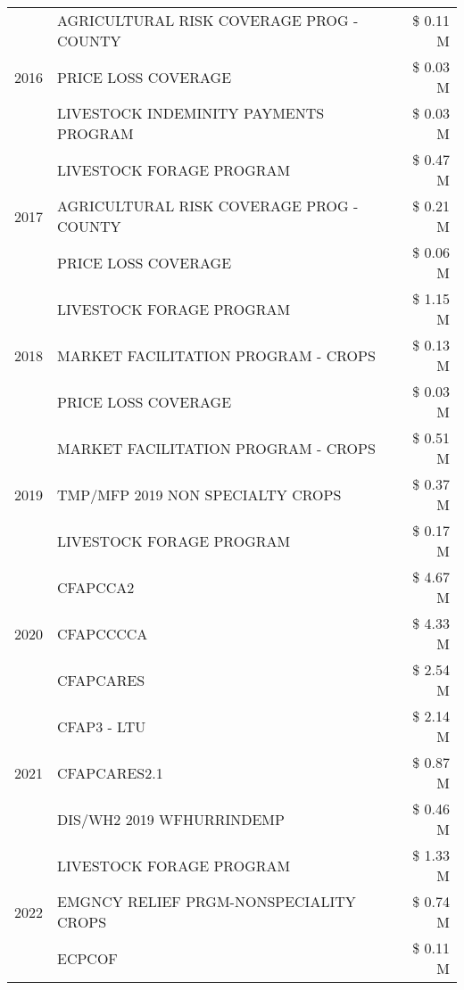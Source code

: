 \begin{tabular}{llr}
\cline{1-3}
\multirow[t]{3}{*}{2016} & AGRICULTURAL RISK COVERAGE PROG - COUNTY & \$ 0.11 M \\
 & PRICE LOSS COVERAGE & \$ 0.03 M \\
 & LIVESTOCK INDEMINITY PAYMENTS PROGRAM & \$ 0.03 M \\
\cline{1-3}
\multirow[t]{3}{*}{2017} & LIVESTOCK FORAGE PROGRAM & \$ 0.47 M \\
 & AGRICULTURAL RISK COVERAGE PROG - COUNTY & \$ 0.21 M \\
 & PRICE LOSS COVERAGE & \$ 0.06 M \\
\cline{1-3}
\multirow[t]{3}{*}{2018} & LIVESTOCK FORAGE PROGRAM & \$ 1.15 M \\
 & MARKET FACILITATION PROGRAM - CROPS & \$ 0.13 M \\
 & PRICE LOSS COVERAGE & \$ 0.03 M \\
\cline{1-3}
\multirow[t]{3}{*}{2019} & MARKET FACILITATION PROGRAM - CROPS & \$ 0.51 M \\
 & TMP/MFP 2019 NON SPECIALTY CROPS & \$ 0.37 M \\
 & LIVESTOCK FORAGE PROGRAM & \$ 0.17 M \\
\cline{1-3}
\multirow[t]{3}{*}{2020} & CFAPCCA2 & \$ 4.67 M \\
 & CFAPCCCCA & \$ 4.33 M \\
 & CFAPCARES & \$ 2.54 M \\
\cline{1-3}
\multirow[t]{3}{*}{2021} & CFAP3 - LTU & \$ 2.14 M \\
 & CFAPCARES2.1 & \$ 0.87 M \\
 & DIS/WH2 2019 WFHURRINDEMP & \$ 0.46 M \\
\cline{1-3}
\multirow[t]{3}{*}{2022} & LIVESTOCK FORAGE PROGRAM & \$ 1.33 M \\
 & EMGNCY RELIEF PRGM-NONSPECIALITY CROPS & \$ 0.74 M \\
 & ECPCOF & \$ 0.11 M \\
\cline{1-3}
\bottomrule
\end{tabular}
